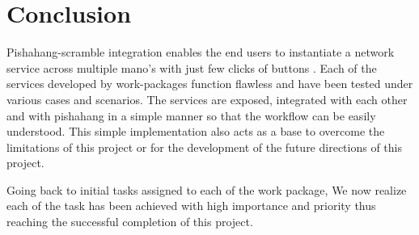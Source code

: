 \chapter{Conclusion}
\label{ch:Conclusion}

Pishahang-scramble integration enables the end users to instantiate a network service across multiple mano's with just few clicks of buttons . Each of the services developed by work-packages function flawless and have been tested under various cases and scenarios. The services are exposed, integrated with each other and with pishahang in a simple manner so that the workflow can be easily understood. This simple implementation also acts as a base to overcome the limitations of this project or for the development of the future directions of this project.

Going back to initial tasks assigned to each of the work package, We now realize each of the task has been achieved with high importance and priority thus reaching the successful completion of this project.        